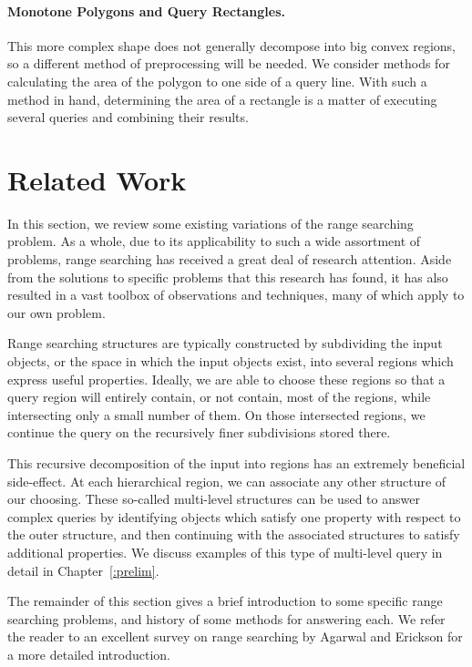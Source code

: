 \paragraph{Monotone Polygons and Query Rectangles.} This more complex shape does not generally decompose into big convex regions, so a different method of preprocessing will be needed.
We consider methods for calculating the area of the polygon to one side of a query line. 
With such a method in hand, determining the area of a rectangle is a matter of executing several queries and combining their results.

\section{Related Work}
\label{:intro:related}

In this section, we review some existing variations of the range searching problem.
As a whole, due to its applicability to such a wide assortment of problems, range searching has received a great deal of research attention.
Aside from the solutions to specific problems that this research has found, it has also resulted in a vast toolbox of observations and techniques, many of which apply to our own problem.

Range searching structures are typically constructed by subdividing the input objects, or the space in which the input objects exist, into several regions which express useful properties.
Ideally, we are able to choose these regions so that a query region will entirely contain, or not contain, most of the regions, while intersecting only a small number of them.
On those intersected regions, we continue the query on the recursively finer subdivisions stored there.\cite{Matousek93}

This recursive decomposition of the input into regions has an extremely beneficial side-effect. 
At each hierarchical region, we can associate any other structure of our choosing.
These so-called multi-level structures can be used to answer complex queries by identifying objects which satisfy one property with respect to the outer structure, and then continuing with the associated structures to satisfy additional properties.
We discuss examples of this type of multi-level query in detail in Chapter~\ref{:prelim}.

The remainder of this section gives a brief introduction to some specific range searching problems, and history of some methods for answering each. 
We refer the reader to an excellent survey on range searching by Agarwal and Erickson\cite{Agarwal99} for a more detailed introduction.


